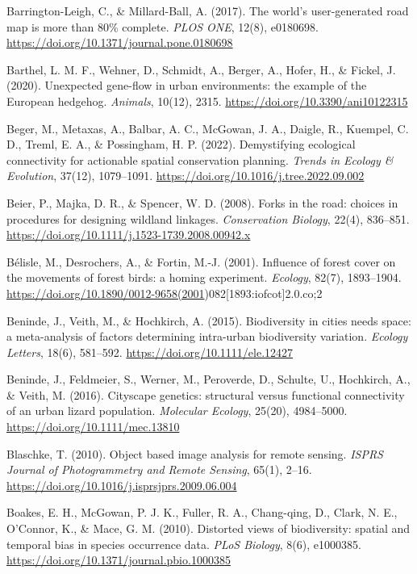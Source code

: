 \documentclass[a4paper,11pt]{report}
\begin{document}
Barrington-Leigh, C., \& Millard-Ball, A. (2017). The world's user-generated road map is more than 80\% complete. \textit{PLOS ONE}, 12(8), e0180698. \url{https://doi.org/10.1371/journal.pone.0180698}

Barthel, L. M. F., Wehner, D., Schmidt, A., Berger, A., Hofer, H., \& Fickel, J. (2020). Unexpected gene-flow in urban environments: the example of the European hedgehog. \textit{Animals}, 10(12), 2315. \url{https://doi.org/10.3390/ani10122315}

Beger, M., Metaxas, A., Balbar, A. C., McGowan, J. A., Daigle, R., Kuempel, C. D., Treml, E. A., \& Possingham, H. P. (2022). Demystifying ecological connectivity for actionable spatial conservation planning. \textit{Trends in Ecology \& Evolution}, 37(12), 1079--1091. \url{https://doi.org/10.1016/j.tree.2022.09.002}

Beier, P., Majka, D. R., \& Spencer, W. D. (2008). Forks in the road: choices in procedures for designing wildland linkages. \textit{Conservation Biology}, 22(4), 836--851. \url{https://doi.org/10.1111/j.1523-1739.2008.00942.x}

Bélisle, M., Desrochers, A., \& Fortin, M.-J. (2001). Influence of forest cover on the movements of forest birds: a homing experiment. \textit{Ecology}, 82(7), 1893--1904. \url{https://doi.org/10.1890/0012-9658(2001})082[1893:iofcot]2.0.co;2

Beninde, J., Veith, M., \& Hochkirch, A. (2015). Biodiversity in cities needs space: a meta-analysis of factors determining intra-urban biodiversity variation. \textit{Ecology Letters}, 18(6), 581--592. \url{https://doi.org/10.1111/ele.12427}

Beninde, J., Feldmeier, S., Werner, M., Peroverde, D., Schulte, U., Hochkirch, A., \& Veith, M. (2016). Cityscape genetics: structural versus functional connectivity of an urban lizard population. \textit{Molecular Ecology}, 25(20), 4984--5000. \url{https://doi.org/10.1111/mec.13810}

Blaschke, T. (2010). Object based image analysis for remote sensing. \textit{ISPRS Journal of Photogrammetry and Remote Sensing}, 65(1), 2--16. \url{https://doi.org/10.1016/j.isprsjprs.2009.06.004}

Boakes, E. H., McGowan, P. J. K., Fuller, R. A., Chang-qing, D., Clark, N. E., O'Connor, K., \& Mace, G. M. (2010). Distorted views of biodiversity: spatial and temporal bias in species occurrence data. \textit{PLoS Biology}, 8(6), e1000385. \url{https://doi.org/10.1371/journal.pbio.1000385}
\end{document}
